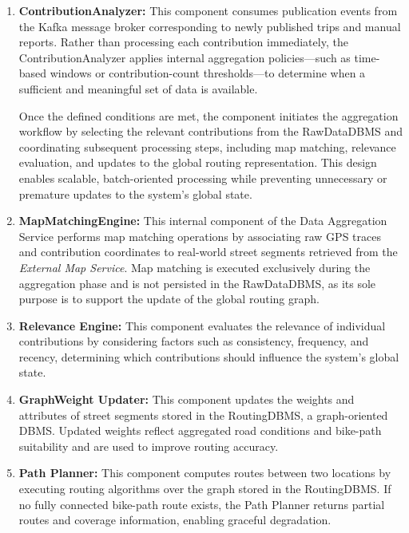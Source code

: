 \begin{enumerate}
    \item \textbf{ContributionAnalyzer:}  
    This component consumes publication events from the Kafka message broker corresponding to newly published trips and manual reports. Rather than processing each contribution immediately, the ContributionAnalyzer applies internal aggregation policies—such as time-based windows or contribution-count thresholds—to determine when a sufficient and meaningful set of data is available.
    
    Once the defined conditions are met, the component initiates the aggregation workflow by selecting the relevant contributions from the RawDataDBMS and coordinating subsequent processing steps, including map matching, relevance evaluation, and updates to the global routing representation. This design enables scalable, batch-oriented processing while preventing unnecessary or premature updates to the system’s global state.


    \item \textbf{MapMatchingEngine:}  
    This internal component of the Data Aggregation Service performs map matching operations by associating raw GPS traces and contribution coordinates to real-world street segments retrieved from the \textit{External Map Service}. Map matching is executed exclusively during the aggregation phase and is not persisted in the RawDataDBMS, as its sole purpose is to support the update of the global routing graph.

    \item \textbf{Relevance Engine:}  
    This component evaluates the relevance of individual contributions by considering factors such as consistency, frequency, and recency, determining which contributions should influence the system’s global state.

    \item \textbf{GraphWeight Updater:}  
    This component updates the weights and attributes of street segments stored in the RoutingDBMS, a graph-oriented DBMS. Updated weights reflect aggregated road conditions and bike-path suitability and are used to improve routing accuracy.

    \item \textbf{Path Planner:}  
    This component computes routes between two locations by executing routing algorithms over the graph stored in the RoutingDBMS. If no fully connected bike-path route exists, the Path Planner returns partial routes and coverage information, enabling graceful degradation.


\end{enumerate}
